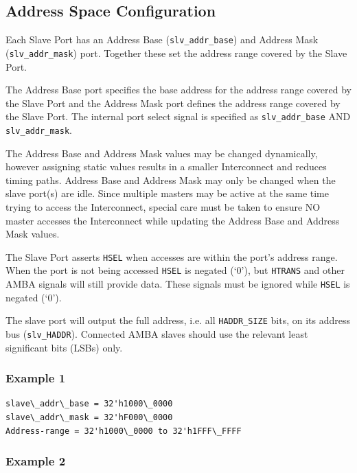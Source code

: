 \subsection{Address Space
Configuration}\label{address-space-configuration}

Each Slave Port has an Address Base (\texttt{slv\_addr\_base}) and Address Mask
(\texttt{slv\_addr\_mask}) port. Together these set the address range covered by
the Slave Port.

The Address Base port specifies the base address for the address range
covered by the Slave Port and the Address Mask port defines the address
range covered by the Slave Port. The internal port select signal is
specified as \texttt{slv\_addr\_base} AND \texttt{slv\_addr\_mask}.

The Address Base and Address Mask values may be changed dynamically,
however assigning static values results in a smaller Interconnect and
reduces timing paths. Address Base and Address Mask may only be changed
when the slave port(s) are idle. Since multiple masters may be active at
the same time trying to access the Interconnect, special care must be
taken to ensure NO master accesses the Interconnect while updating the
Address Base and Address Mask values.

The Slave Port asserts \texttt{HSEL} when accesses are within the port's address
range. When the port is not being accessed \texttt{HSEL} is negated (`0'), but
\texttt{HTRANS} and other AMBA signals will still provide data. These signals
must be ignored while \texttt{HSEL} is negated (`0').

The slave port will output the full address, i.e. all \texttt{HADDR\_SIZE} bits,
on its address bus (\texttt{slv\_HADDR}). Connected AMBA slaves should use the
relevant least significant bits (LSBs) only.

\pagebreak

\subsubsection{Example 1}\label{example-1}

\begin{verbatim}
slave\_addr\_base = 32'h1000\_0000
slave\_addr\_mask = 32'hF000\_0000
Address-range = 32'h1000\_0000 to 32'h1FFF\_FFFF
\end{verbatim}

\subsubsection{Example 2}\label{example-2}

